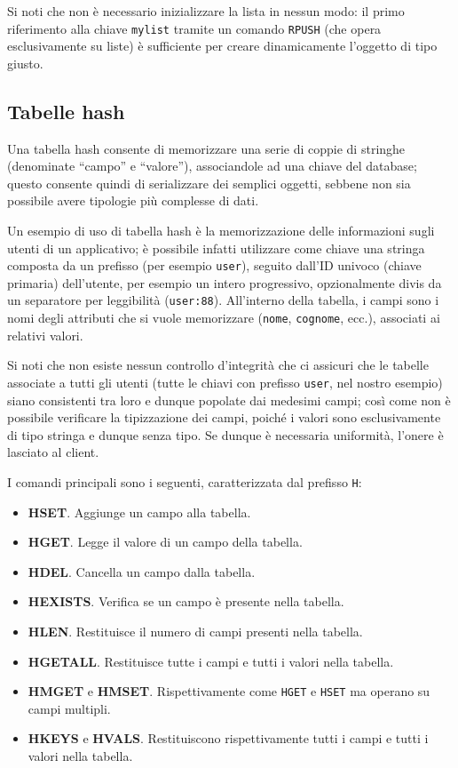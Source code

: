 Si noti che non è necessario inizializzare la lista in nessun modo: il primo riferimento alla chiave
\verb|mylist| tramite un comando \verb|RPUSH| (che opera esclusivamente su liste) è sufficiente
per creare dinamicamente l'oggetto di tipo giusto.

\subsection{Tabelle hash}

Una tabella hash consente di memorizzare una serie di coppie di stringhe (denominate ``campo'' e ``valore''),
associandole ad una chiave del database; questo consente quindi di serializzare dei semplici oggetti, sebbene
non sia possibile avere tipologie più complesse di dati.

Un esempio di uso di tabella hash è la memorizzazione delle informazioni sugli utenti di un applicativo; è
possibile infatti utilizzare come chiave una stringa composta da un prefisso (per esempio \verb|user|), seguito
dall'ID univoco (chiave primaria) dell'utente, per esempio un intero progressivo, opzionalmente divis da un
separatore per leggibilità (\verb|user:88|). All'interno della tabella, i campi sono i nomi degli attributi che
si vuole memorizzare (\verb|nome|, \verb|cognome|, ecc.), associati ai relativi valori. 

Si noti che non esiste nessun controllo d'integrità che ci assicuri che le tabelle associate a tutti gli utenti
(tutte le chiavi con prefisso \verb|user|, nel nostro esempio) siano consistenti tra loro e dunque popolate dai
medesimi campi; così come non è possibile verificare la tipizzazione dei campi, poiché i valori sono esclusivamente
di tipo stringa e dunque senza tipo. Se dunque è necessaria uniformità, l'onere è lasciato al client.

I comandi principali sono i seguenti, caratterizzata dal prefisso \verb|H|:

\begin{itemize}
	\medskip
	\item \textbf{HSET}. Aggiunge un campo alla tabella.
	\item \textbf{HGET}. Legge il valore di un campo della tabella.
	\item \textbf{HDEL}. Cancella un campo dalla tabella.
	\item \textbf{HEXISTS}. Verifica se un campo è presente nella tabella.
	\item \textbf{HLEN}. Restituisce il numero di campi presenti nella tabella.
	\item \textbf{HGETALL}. Restituisce tutte i campi e tutti i valori nella tabella.
	\item \textbf{HMGET} e \textbf{HMSET}. Rispettivamente come \verb|HGET| e \verb|HSET| ma operano su campi multipli.
	\item \textbf{HKEYS} e \textbf{HVALS}. Restituiscono rispettivamente tutti i campi e tutti i valori nella tabella.
\end{itemize}

